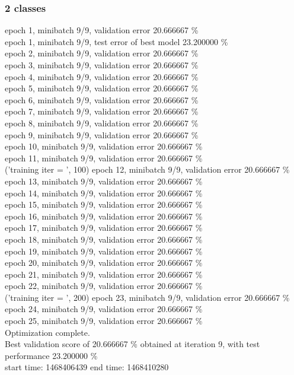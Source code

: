 \documentclass[a4paper]{article}
\begin{document}
\subsubsection{2 classes}
epoch 1, minibatch 9/9, validation error 20.666667 \% \\
     epoch 1, minibatch 9/9, test error of best model 23.200000 \% \\
epoch 2, minibatch 9/9, validation error 20.666667 \% \\
epoch 3, minibatch 9/9, validation error 20.666667 \% \\
epoch 4, minibatch 9/9, validation error 20.666667 \% \\
epoch 5, minibatch 9/9, validation error 20.666667 \% \\
epoch 6, minibatch 9/9, validation error 20.666667 \% \\
epoch 7, minibatch 9/9, validation error 20.666667 \% \\
epoch 8, minibatch 9/9, validation error 20.666667 \% \\
epoch 9, minibatch 9/9, validation error 20.666667 \% \\
epoch 10, minibatch 9/9, validation error 20.666667 \% \\
epoch 11, minibatch 9/9, validation error 20.666667 \% \\
('training \@ iter = ', 100)
epoch 12, minibatch 9/9, validation error 20.666667 \% \\
epoch 13, minibatch 9/9, validation error 20.666667 \% \\
epoch 14, minibatch 9/9, validation error 20.666667 \% \\
epoch 15, minibatch 9/9, validation error 20.666667 \% \\
epoch 16, minibatch 9/9, validation error 20.666667 \% \\
epoch 17, minibatch 9/9, validation error 20.666667 \% \\
epoch 18, minibatch 9/9, validation error 20.666667 \% \\
epoch 19, minibatch 9/9, validation error 20.666667 \% \\
epoch 20, minibatch 9/9, validation error 20.666667 \% \\
epoch 21, minibatch 9/9, validation error 20.666667 \% \\
epoch 22, minibatch 9/9, validation error 20.666667 \% \\
('training \@ iter = ', 200)
epoch 23, minibatch 9/9, validation error 20.666667 \% \\
epoch 24, minibatch 9/9, validation error 20.666667 \% \\
epoch 25, minibatch 9/9, validation error 20.666667 \% \\
Optimization complete. \\
Best validation score of 20.666667 \% obtained at iteration 9, with test performance 23.200000 \% \\
start time: 1468406439
end time: 1468410280
\end{document}
